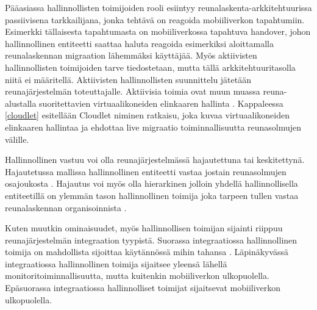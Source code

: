 Pääasiassa hallinnollisten toimijoiden rooli esiintyy reunalaskenta-arkkitehtuurissa passiivisena tarkkailijana, jonka tehtävä on reagoida mobiiliverkon tapahtumiin. 
Esimerkki tällaisesta tapahtumasta on mobiiliverkossa tapahtuva handover, johon hallinnollinen entiteetti saattaa haluta reagoida esimerkiksi aloittamalla reunalaskennan migraation lähemmäksi käyttäjää. 
Myös aktiivisten hallinnollisten toimijoiden tarve tiedostetaan, mutta tällä arkkitehtuuritasolla niitä ei määritellä.
Aktiivisten hallinnollisten suunnittelu jätetään reunajärjestelmän toteuttajalle.
Aktiivisia toimia ovat muun muassa reuna-alustalla suoritettavien virtuaalikoneiden elinkaaren hallinta \cite{yousaf16fine}. Kappaleessa \ref{cloudlet} esitellään Cloudlet niminen ratkaisu, joka kuvaa virtuaalikoneiden elinkaaren hallintaa ja ehdottaa live migraatio toiminnallisuutta reunasolmujen välille.


Hallinnollinen vastuu voi olla reunajärjestelmässä hajautettuna tai keskitettynä.
Hajautetussa mallissa hallinnollinen entiteetti vastaa jostain reunasolmujen osajoukosta \cite{lobillo15scc}. Hajautus voi myös olla hierarkinen jolloin yhdellä hallinnollisella entiteetillä on ylemmän tason hallinnollinen toimija joka tarpeen tullen vastaa reunalaskennan organisoinnista \cite{mach17mobile}.

Kuten muutkin ominaisuudet, myös hallinnollisen toimijan sijainti riippuu reunajärjestelmän integraation tyypistä. 
Suorassa integraatiossa hallinnollinen toimija on mahdollista sijoittaa käytännössä mihin tahansa \cite{mach17mobile}.
Läpinäkyvässä integraatiossa hallinnollinen toimija sijaitsee yleensä lähellä monitoritoiminnallisuutta, mutta kuitenkin mobiiliverkon ulkopuolella. 
Epäsuorassa integraatiossa hallinnolliset toimijat sijaitsevat mobiiliverkon ulkopuolella.

